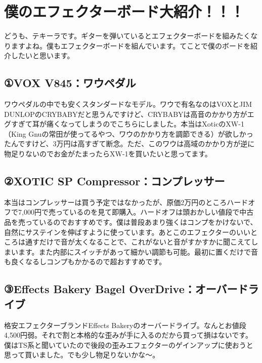 
\subsecnomaru

\section{僕のエフェクターボード大紹介！！！}
\label{sec:effector}


どうも、テキーラです。ギターを弾いているとエフェクターボードを組みたくなりますよね。僕もエフェクターボードを組んでいます。てことで僕のボードを紹介したいと思います。


\subsection{①VOX V845：ワウペダル}

ワウペダルの中でも安くスタンダードなモデル。ワウで有名なのはVOXとJIM DUNLOPのCRYBABYだと思うんですけど、CRYBABYは高音のかかり方がエグすぎて耳が痛くなってしまうのでこちらにしました。本当はXoticのXW-1（King Gnuの常田が使ってるやつ、ワウのかかり方を調節できる）が欲しかったんですけど、3万円は高すぎて断念。ただ、このワウは高域のかかり方が逆に物足りないのでお金がたまったらXW-1を買いたいと思ってます。

\subsection{②XOTIC SP Compressor：コンプレッサー}

本当はコンプレッサーは買う予定ではなかったが、原価2万円のところハードオフで7,000円で売っているのを見て即購入。ハードオフは頭おかしい値段で中古品を売っているのでおすすめです。僕は普段あまり強くはコンプをかけないで、自然にサステインを伸ばすように使っています。あとこのエフェクターのいいところは通すだけで音が太くなることで、これがないと音がすかすかに聞こえてしまいます。また内部にスイッチがあって細かい調節も可能。最初に置くだけで音も良くなるしコンプもかかるので超おすすめです。

\subsection{③Effects Bakery Bagel OverDrive：オーバードライブ}

格安エフェクターブランドEffects Bakeryのオーバードライブ。なんとお値段4,500円弱。それで割と本格的な歪みが手に入るのだから買って損はないです。僕はTS系と聞いていたので後段の歪みエフェクターのゲインアップに使おうと思って買いました。でも少し物足りないかな～。

